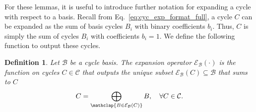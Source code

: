 \documentclass[fleqn,11pt]{article}
\newtheorem{definition}{Definition}
\newcommand\calB{\mathcal{B}}
\newcommand\CycSp{\mathcal{C}}    %
\newcommand\expand[2]{\mathcal{E}_{#1}\left(#2\right)}   %
\newcommand\symdiff{\mathop{\triangle}}
\begin{document}
	
	
	For these lemmas, it is useful to introduce further notation for expanding a cycle with respect to a basis. Recall from Eq.~\eqref{eq:cyc_exp_format_full}, a cycle $C$ can be expanded as the sum of basis cycles $B_i$ with binary coefficients $b_i$. Thus, $C$ is simply the sum of cycles $B_i$ with coefficients $b_i=1$. We define the following function to output these cycles. 
	\begin{definition}
		Let $\calB$ be a cycle basis. The \emph{expansion operator} $\expand{\calB}{\cdot}$ is the function on cycles $C\in\CycSp$ that outputs the unique subset $\expand{\calB}{C}\subseteq\calB$ that sums to $C$
		\begin{equation}
			C = \bigoplus_{\mathclap{B\in\expand{\calB}{C}}} B,\quad \forall C\in\CycSp.
		\end{equation}
		\label{def:ex_op}
	\end{definition}
	
	
\end{document}
